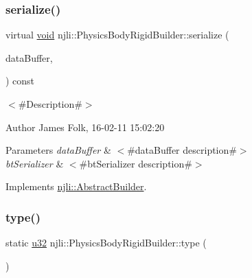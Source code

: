 \subsubsection{\texorpdfstring{serialize()}{serialize()}}
{\footnotesize\ttfamily virtual \mbox{\hyperlink{_thread_8h_af1e856da2e658414cb2456cb6f7ebc66}{void}} njli\+::\+Physics\+Body\+Rigid\+Builder\+::serialize (\begin{DoxyParamCaption}\item[{\mbox{\hyperlink{_thread_8h_af1e856da2e658414cb2456cb6f7ebc66}{void}} $\ast$}]{data\+Buffer,  }\item[{bt\+Serializer $\ast$}]{ }\end{DoxyParamCaption}) const\hspace{0.3cm}{\ttfamily [virtual]}}



$<$\#\+Description\#$>$ 

\begin{DoxyAuthor}{Author}
James Folk, 16-\/02-\/11 15\+:02\+:20
\end{DoxyAuthor}

\begin{DoxyParams}{Parameters}
{\em data\+Buffer} & $<$\#data\+Buffer description\#$>$ \\
\hline
{\em bt\+Serializer} & $<$\#bt\+Serializer description\#$>$ \\
\hline
\end{DoxyParams}


Implements \mbox{\hyperlink{classnjli_1_1_abstract_builder_ab66b774e02ccb9da554c9aab7fa6d981}{njli\+::\+Abstract\+Builder}}.

\mbox{\label{classnjli_1_1_physics_body_rigid_builder_a7f6dc2947c99ff79f5d8ccb376ecca34}} 
\subsubsection{\texorpdfstring{type()}{type()}}
{\footnotesize\ttfamily static \mbox{\hyperlink{_util_8h_a10e94b422ef0c20dcdec20d31a1f5049}{u32}} njli\+::\+Physics\+Body\+Rigid\+Builder\+::type (\begin{DoxyParamCaption}{ }\end{DoxyParamCaption})\hspace{0.3cm}{\ttfamily [static]}}

